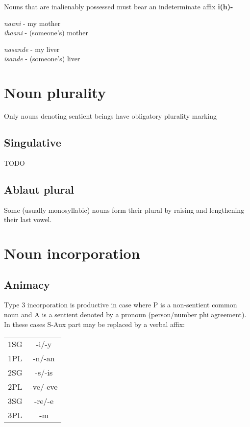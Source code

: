 \documentclass[8pt]{book}
\begin{document}
Nouns that are inalienably possessed must bear an indeterminate affix \textbf{i(h)-}

\begin{exe}
\ex \textit{naani} - my mother \\
 \textit{ihaani} - (someone's) mother

\ex \textit{nasande} - my liver \\
 \textit{isande} - (someone's) liver

\end{exe}


\section{Noun plurality}
Only nouns denoting sentient beings have obligatory plurality marking

\subsection{Singulative}
TODO

\subsection{Ablaut plural}
Some (usually monosyllabic) nouns form their plural by raising and lengthening their last vowel.



\section{Noun incorporation}

\subsection{Animacy}
Type 3 incorporation is productive in case where P is a non-sentient common noun and A is a sentient denoted by a pronoun (person/number phi agreement). In these cases S-Aux part may be replaced by a verbal affix:

\begin{tabular}{c | c}
  1SG & -i/-y \\
  1PL & -n/-an \\
  2SG & -s/-is \\
  2PL & -ve/-eve \\
  3SG & -re/-e \\
  3PL & -m \\
\end{tabular}
\end{document}
